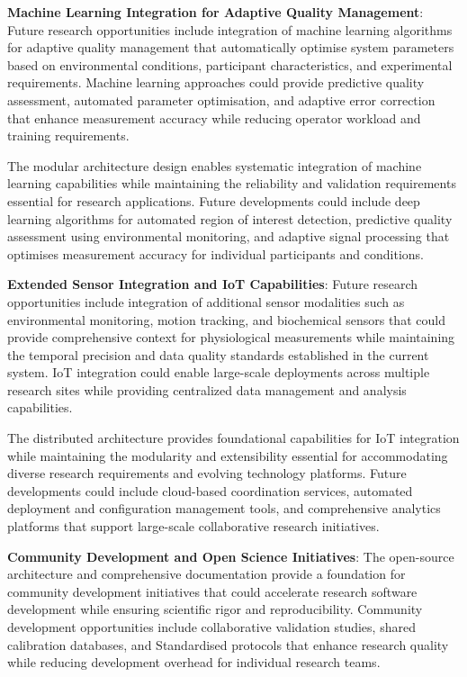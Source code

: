 \documentclass[11pt,a4paper]{report}
\begin{document}
\noindent \textbf{Machine Learning Integration for Adaptive Quality Management}: Future research opportunities include integration of machine learning algorithms for adaptive quality management that automatically optimise system parameters based on environmental conditions, participant characteristics, and experimental requirements. Machine learning approaches could provide predictive quality assessment, automated parameter optimisation, and adaptive error correction that enhance measurement accuracy while reducing operator workload and training requirements.

The modular architecture design enables systematic integration of machine learning capabilities while maintaining the reliability and validation requirements essential for research applications. Future developments could include deep learning algorithms for automated region of interest detection, predictive quality assessment using environmental monitoring, and adaptive signal processing that optimises measurement accuracy for individual participants and conditions.

\noindent \textbf{Extended Sensor Integration and IoT Capabilities}: Future research opportunities include integration of additional sensor modalities such as environmental monitoring, motion tracking, and biochemical sensors that could provide comprehensive context for physiological measurements while maintaining the temporal precision and data quality standards established in the current system. IoT integration could enable large-scale deployments across multiple research sites while providing centralized data management and analysis capabilities.

The distributed architecture provides foundational capabilities for IoT integration while maintaining the modularity and extensibility essential for accommodating diverse research requirements and evolving technology platforms. Future developments could include cloud-based coordination services, automated deployment and configuration management tools, and comprehensive analytics platforms that support large-scale collaborative research initiatives.

\noindent \textbf{Community Development and Open Science Initiatives}: The open-source architecture and comprehensive documentation provide a foundation for community development initiatives that could accelerate research software development while ensuring scientific rigor and reproducibility. Community development opportunities include collaborative validation studies, shared calibration databases, and Standardised protocols that enhance research quality while reducing development overhead for individual research teams.
\end{document}

